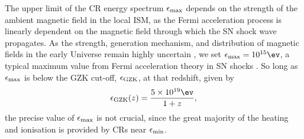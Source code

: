 The upper limit of the CR energy spectrum $\epsilon_{\rm max}$ depends on the strength of the ambient magnetic field in the local ISM, as the Fermi acceleration process is linearly dependent on the magnetic field through which the SN shock wave propagates. 
As the strength, generation mechanism, and distribution of magnetic fields in the early Universe remain highly uncertain \citep{DurrerNeronov2013}, we set $\epsilon_{\rm max} = 10^{15}\ev$, a typical maximum value from Fermi acceleration theory in SN shocks \citep[e.g.,][]{BlandfordEichler1987}.  
So long as $\epsilon_{\rm max}$ is below the GZK cut-off, $\epsilon_{\rm \small GZK}$, at that redshift, given by \citep{StacyBromm2007}
\begin{equation}
\epsilon_{\rm \small GZK}(z) = \frac{5\times10^{19}\ev}{1+z},
\end{equation}
the precise value of $\epsilon_{\rm max}$ is not crucial, since the great majority of the heating and ionisation is provided by CRs near $\epsilon_{\rm min}$.


